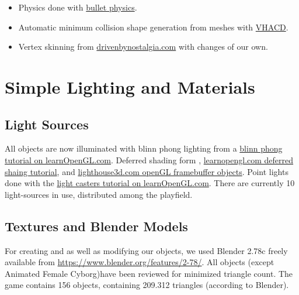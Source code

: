 \documentclass[12pt]{article}
\begin{document}
\begin{itemize}
  \item Physics done with \href{http://bulletphysics.org/wordpress/}{bullet physics}.

  \item Automatic minimum collision shape generation from meshes with \href{https://github.com/kmammou/v-hacd}{VHACD}.

  \item Vertex skinning from \href{http://drivenbynostalgia.com/}{drivenbynostalgia.com} with changes of our own.
\end{itemize}


\section{Simple Lighting and Materials}


\subsection{Light Sources \label{lightSources}}
All objects are now illuminated with blinn phong lighting from a \href{http://learnopengl.com/#!Advanced-Lighting/Advanced-Lighting}{blinn phong tutorial on learnOpenGL.com}. Deferred shading form \cite{openGLSuperBible}, \href{http://learnopengl.com/#!Advanced-Lighting/Deferred-Shading}{learnopengl.com deferred shaing tutorial}, and \href{http://www.lighthouse3d.com/tutorials/opengl_framebuffer_objects/}{lighthouse3d.com openGL framebuffer objects}.
Point lights done with the \href{http://learnopengl.com/#!Lighting/Light-casters}{light casters tutorial on learnOpenGL.com}. There are currently 10 light-sources in use, distributed among the playfield.


\subsection{Textures and Blender Models}

For creating and as well as modifying our objects, we used Blender 2.78c freely available from \url{https://www.blender.org/features/2-78/}. All objects (except Animated Female Cyborg)have been reviewed for minimized triangle count. The game contains 156 objects, containing 209.312 triangles (according to Blender).
\end{document}
